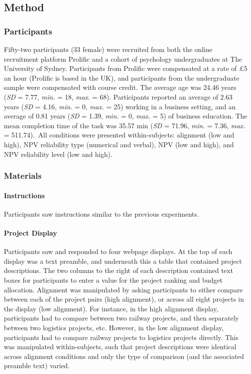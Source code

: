 \documentclass[a4paper, nobind]{templates/ociamthesis}
\theoremstyle{definition}
\theoremstyle{definition}
\theoremstyle{definition}
\theoremstyle{definition}
\theoremstyle{remark}
\begin{document}
\subsection{Method}

\subsubsection{Participants}

Fifty-two participants (33 female) were recruited from both the online recruitment platform Prolific and a cohort of psychology undergraduates at The University of Sydney. Participants from Prolific were compensated at a rate of \pounds 5 an hour (Prolific is based in the UK), and participants from the undergraduate sample were compensated with course credit. The average age was 24.46 years (\emph{SD} = 7.77, \emph{min.} = 18, \emph{max.} = 68). Participants reported an average of 2.63 years (\emph{SD} = 4.16, \emph{min.} = 0, \emph{max.} = 25) working in a business setting, and an average of 0.81 years (\emph{SD} = 1.39, \emph{min.} = 0, \emph{max.} = 5) of business education. The mean completion time of the task was 35.57 min (\emph{SD} = 71.96, \emph{min.} = 7.36, \emph{max.} = 511.74).~All conditions were presented within-subjects:
alignment (low and high), NPV reliability type (numerical and verbal), NPV (low
and high), and NPV reliability level (low and high).

\subsubsection{Materials}

\paragraph{Instructions}

Participants saw instructions similar to the previous experiments.

\paragraph{Project Display}

Participants saw and responded to four webpage displays. At the top of each
display was a text preamble, and underneath this a table that contained project
descriptions. The two columns to the right of each description contained text
boxes for participants to enter a value for the project ranking and budget
allocation. Alignment was manipulated by asking participants to either compare
between each of the project pairs (high alignment), or across all eight projects
in the display (low alignment). For instance, in the high alignment display,
participants had to compare between two railway projects, and then separately
between two logistics projects, etc. However, in the low alignment display,
participants had to compare railway projects to logistics projects directly.
This was manipulated within-subjects, such that project descriptions were
identical across alignment conditions and only the type of comparison (and the
associated preamble text) varied.
\end{document}

